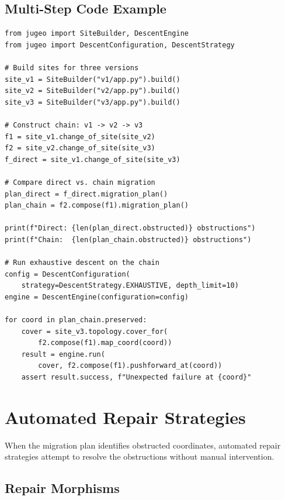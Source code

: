 \documentclass[11pt]{article}
\begin{document}
\subsection{Multi-Step Code Example}

\begin{lstlisting}[style=jugeo-python]
from jugeo import SiteBuilder, DescentEngine
from jugeo import DescentConfiguration, DescentStrategy

# Build sites for three versions
site_v1 = SiteBuilder("v1/app.py").build()
site_v2 = SiteBuilder("v2/app.py").build()
site_v3 = SiteBuilder("v3/app.py").build()

# Construct chain: v1 -> v2 -> v3
f1 = site_v1.change_of_site(site_v2)
f2 = site_v2.change_of_site(site_v3)
f_direct = site_v1.change_of_site(site_v3)

# Compare direct vs. chain migration
plan_direct = f_direct.migration_plan()
plan_chain = f2.compose(f1).migration_plan()

print(f"Direct: {len(plan_direct.obstructed)} obstructions")
print(f"Chain:  {len(plan_chain.obstructed)} obstructions")

# Run exhaustive descent on the chain
config = DescentConfiguration(
    strategy=DescentStrategy.EXHAUSTIVE, depth_limit=10)
engine = DescentEngine(configuration=config)

for coord in plan_chain.preserved:
    cover = site_v3.topology.cover_for(
        f2.compose(f1).map_coord(coord))
    result = engine.run(
        cover, f2.compose(f1).pushforward_at(coord))
    assert result.success, f"Unexpected failure at {coord}"
\end{lstlisting}

\section{Automated Repair Strategies}\label{sec:repair}

When the migration plan identifies obstructed coordinates, automated repair
strategies attempt to resolve the obstructions without manual intervention.

\subsection{Repair Morphisms}
\end{document}
